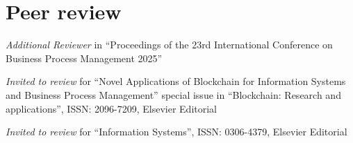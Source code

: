 \section{Peer review}

    \textit{Additional Reviewer} in ``Proceedings of the 23rd International Conference on Business Process Management 2025''
    

    \abitspace
    
    \textit{Invited to review} for ``Novel Applications of Blockchain for Information Systems and Business Process Management'' special issue in ``Blockchain: Research and applications'', ISSN: 2096-7209, Elsevier Editorial

    \abitspace
    
    \textit{Invited to review} for ``Information Systems'', ISSN: 0306-4379, Elsevier Editorial 